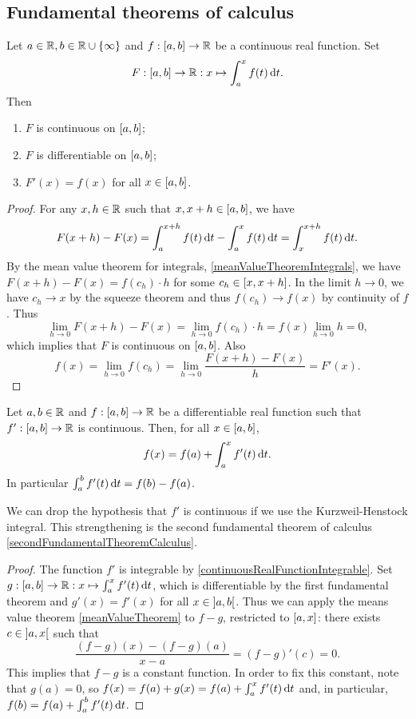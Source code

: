 \subsection{Fundamental theorems of calculus}
\begin{theorem} \label{firstFundamentalTheoremCalculus}
Let $a\in \mathbb{R},b\in \mathbb{R}\cup\{\infty\}$ and $f:\interval{a,b}\to \R$ be a continuous real function. Set
\[ F: \interval{a,b} \to \R: x\mapsto \int_a^x f(t) \diff{t}. \]
Then
\begin{enumerate}
\item $F$ is continuous on $\interval{a,b}$;
\item $F$ is differentiable on $\interval{a,b}$;
\item $F'(x) = f(x)$ for all $x\in \interval{a,b}$.
\end{enumerate}
\end{theorem}
\begin{proof}
For any $x,h\in \mathbb{R}$ such that $x, x+h\in \interval{a,b}$, we have
\[ F(x+h) - F(x) = \int_a^{x+h}f(t)\operatorname{d \!}{t} - \int_a^{x}f(t)\operatorname{d \!}{t} = \int_x^{x+h}f(t)\operatorname{d \!}{t}. \]
By the mean value theorem for integrals, \ref{meanValueTheoremIntegrals}, we have $F(x+h) - F(x) = f(c_h)\cdot h$ for some $c_h\in \interval{x,x+h}$. In the limit $h\to 0$, we have $c_h\to x$ by the squeeze theorem and thus $f(c_h)\to f(x)$ by continuity of $f$. Thus
\[ \lim_{h\to 0}F(x+h) - F(x) = \lim_{h\to 0}f(c_h)\cdot h = f(x)\lim_{h\to 0}h = 0, \]
which implies that $F$ is continuous on $\interval{a,b}$.
Also
\[ f(x) = \lim_{h\to 0}f(c_h) = \lim_{h\to 0}\frac{F(x+h) - F(x)}{h} = F'(x). \]
\end{proof}
\begin{corollary}  \label{weakSecondTheoremCalculus}
Let $a,b\in \mathbb{R}$ and $f:\interval{a,b}\to \R$ be a differentiable real function such that $f': \interval{a,b}\to \R$ is continuous. Then, for all $x\in \interval{a,b}$,
\[ f(x) = f(a) + \int_a^xf'(t)\operatorname{d \!}{t}. \]
In particular $\int_a^bf'(t)\operatorname{d \!}{t} = f(b)-f(a)$.
\end{corollary}
We can drop the hypothesis that $f'$ is continuous if we use the Kurzweil-Henstock integral. This strengthening is the second fundamental theorem of calculus \ref{secondFundamentalTheoremCalculus}.
\begin{proof}
The function $f'$ is integrable by \ref{continuousRealFunctionIntegrable}.
Set $g: \interval{a,b}\to \R: x\mapsto \int_a^xf'(t)\diff{t}$, which is differentiable by the first fundamental theorem and $g'(x) = f'(x)$ for all $x\in \interval[o]{a,b}$. Thus we can apply the means value theorem \ref{meanValueTheorem} to $f-g$, restricted to $\interval{a,x}$: there exists $c\in \interval[o]{a,x}$ such that
\[ \frac{(f-g)(x) - (f-g)(a)}{x-a} = (f-g)'(c) = 0. \]
This implies that $f-g$ is a constant function. In order to fix this constant, note that $g(a) = 0$, so $f(x) = f(a) + g(x) = f(a) + \int_a^xf'(t)\operatorname{d \!}{t}$ and, in particular, $f(b) = f(a) + \int_a^bf'(t)\operatorname{d \!}{t}$.
\end{proof}

